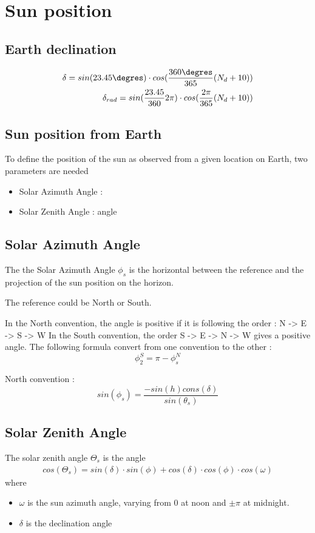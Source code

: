 \documentclass[12pt,a4paper]{article}
\begin{document}
\section{Sun position} 

\subsection{Earth declination}
\begin{eqnarray}
	\delta = sin(23.45 \degres) \cdot cos(\dfrac{360 \degres}{365}(N_d+10))\\
	\delta_{rad} = sin(\frac{23.45}{360} 2\pi) \cdot cos(\dfrac{2 \pi}{365}(N_d+10))
\end{eqnarray}
\subsection{Sun position from Earth}
To define the position of the sun as observed from a given location on Earth, two parameters are needed 
\begin{itemize}
	\item Solar Azimuth Angle : 
	\item Solar Zenith Angle : angle 
\end{itemize}
\subsection{Solar Azimuth Angle}
The the Solar Azimuth Angle $\phi_s$ is the horizontal between the reference and the projection of the sun position on the horizon.

The reference could be North or South.

In the North convention, the angle is positive if it is following the order : N -> E -> S -> W
In the South convention, the order S -> E -> N -> W gives a positive angle. 
The following formula convert from one convention to the other :
\begin{equation}
	\phi_2^{S} = \pi - \phi_s^{N}
\end{equation}



North convention :
\begin{equation}
	sin(\phi_s) = \frac{-sin(h) cons(\delta)}{sin(\theta_s)}
\end{equation}

\subsection{Solar Zenith Angle}
The solar zenith angle $\Theta_{s}$ is the angle 
\begin{eqnarray}
cos(\Theta_{s}) = sin(\delta) \cdot sin(\phi) + cos(\delta) \cdot cos(\phi) \cdot cos(\omega)
\end{eqnarray}
where
\begin{itemize}
	\item $\omega$ is the sun azimuth angle, varying from 0 at noon and $\pm \pi$ at midnight. 
	\item $\delta$ is the declination angle
\end{itemize}
\end{document}
